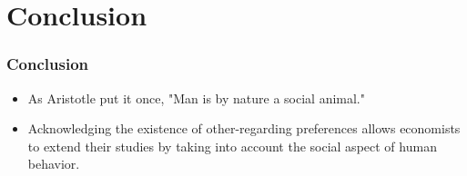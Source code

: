 \documentclass{beamer}
\begin{document}
\section{Conclusion}

\begin{frame}
	\frametitle{Conclusion}
	\begin{itemize}
		\item As Aristotle put it once, "Man is by nature a social animal."
		\item Acknowledging the existence of other-regarding preferences allows economists to extend their studies by taking into account the social aspect of human behavior.
	\end{itemize}
\end{frame}
\end{document}
